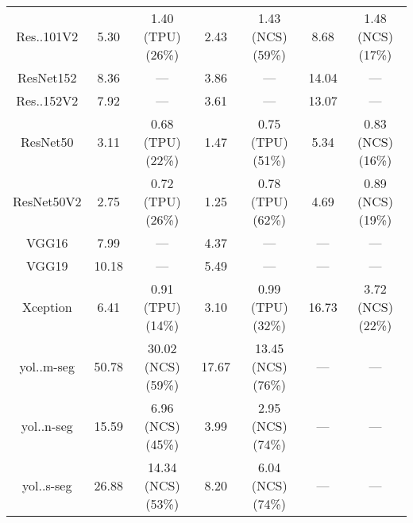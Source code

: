 \begin{tabular}{c|cc|cc|cc}
        Res..101V2 & 5.30 & 1.40 (\colorbox{RC}{TPU}) (\colorbox{RC}{26\%}) & 2.43 & 1.43 (\colorbox{RA}{NCS}) (\colorbox{RC}{59\%}) & 8.68 & 1.48 (\colorbox{RA}{NCS}) (\colorbox{RC}{17\%}) \\
        ResNet152 & 8.36 & --- & 3.86 & --- & 14.04 & --- \\
        Res..152V2 & 7.92 & --- & 3.61 & --- & 13.07 & --- \\
        ResNet50 & 3.11 & 0.68 (\colorbox{RC}{TPU}) (\colorbox{RC}{22\%}) & 1.47 & 0.75 (\colorbox{RC}{TPU}) (\colorbox{RC}{51\%}) & 5.34 & 0.83 (\colorbox{RA}{NCS}) (\colorbox{RC}{16\%}) \\
        ResNet50V2 & 2.75 & 0.72 (\colorbox{RC}{TPU}) (\colorbox{RC}{26\%}) & 1.25 & 0.78 (\colorbox{RC}{TPU}) (\colorbox{RE}{62\%}) & 4.69 & 0.89 (\colorbox{RA}{NCS}) (\colorbox{RC}{19\%}) \\
        VGG16 & 7.99 & --- & 4.37 & --- & --- & --- \\
        VGG19 & 10.18 & --- & 5.49 & --- & --- & --- \\
        Xception & 6.41 & 0.91 (\colorbox{RC}{TPU}) (\colorbox{RA}{14\%}) & 3.10 & 0.99 (\colorbox{RC}{TPU}) (\colorbox{RC}{32\%}) & 16.73 & 3.72 (\colorbox{RA}{NCS}) (\colorbox{RC}{22\%}) \\
        yol..m-seg & 50.78 & 30.02 (\colorbox{RA}{NCS}) (\colorbox{RC}{59\%}) & 17.67 & 13.45 (\colorbox{RA}{NCS}) (\colorbox{RE}{76\%}) & --- & --- \\
        yol..n-seg & 15.59 & 6.96 (\colorbox{RA}{NCS}) (\colorbox{RC}{45\%}) & 3.99 & 2.95 (\colorbox{RA}{NCS}) (\colorbox{RE}{74\%}) & --- & --- \\
        yol..s-seg & 26.88 & 14.34 (\colorbox{RA}{NCS}) (\colorbox{RC}{53\%}) & 8.20 & 6.04 (\colorbox{RA}{NCS}) (\colorbox{RE}{74\%}) & --- & --- \\
\end{tabular}